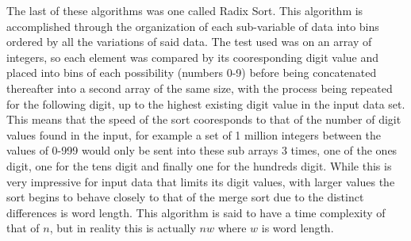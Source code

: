\documentclass[10pt]{article}
\newcommand\tab[1][.5cm]{\hspace*{#1}}
\begin{document}
\tab The last of these algorithms was one called Radix Sort.  This algorithm is accomplished through the organization of each sub-variable of data into bins ordered by all the variations of said data.  The test used was on an array of integers, so each element was compared by its cooresponding digit value and placed into bins of each possibility (numbers 0-9) before being concatenated thereafter into a second array of the same size, with the process being repeated for the following digit, up to the highest existing digit value in the input data set.  This means that the speed of the sort cooresponds to that of the number of digit values found in the input, for example a set of 1 million integers between the values of 0-999 would only be sent into these sub arrays 3 times, one of the ones digit, one for the tens digit and finally one for the hundreds digit.  While this is very impressive for input data that limits its digit values, with larger values the sort begins to behave closely to that of the merge sort due to the distinct differences is word length. This algorithm is said to have a time complexity of that of $n$, but in reality this is actually $nw$ where $w$ is word length.
\end{document}
